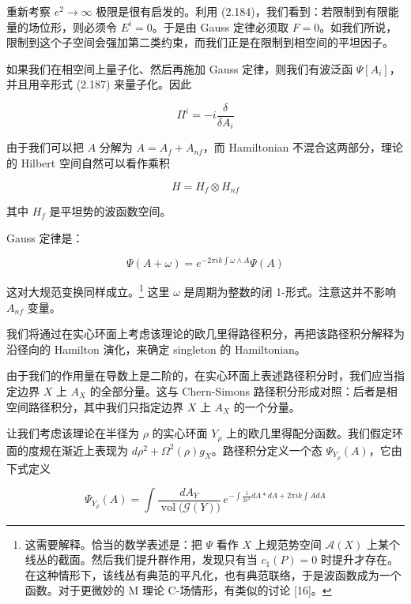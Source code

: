 重新考察 $e^2\to\infty$ 极限是很有启发的。利用 (2.184)，我们看到：若限制到有限能量的场位形，则必须令 $E^i=0$。于是由 Gauss 定律必须取 $F=0$。如我们所说，限制到这个子空间会强加第二类约束，而我们正是在限制到相空间的平坦因子。

如果我们在相空间上量子化、然后再施加 Gauss 定律，则我们有波泛函 $\Psi[A_i]$，并且用辛形式 (2.187) 来量子化。因此

\begin{equation}
  \Pi^i=-i\frac{\delta}{\delta A_i}
  \tag{2.189}
  \label{eq:2.189}
\end{equation}

由于我们可以把 $A$ 分解为 $A=A_f+A_{nf}$，而 Hamiltonian 不混合这两部分，理论的 Hilbert 空间自然可以看作乘积

\begin{equation}
  H=H_f\otimes H_{nf}
  \tag{2.190}
  \label{eq:2.190}
\end{equation}

其中 $H_f$ 是平坦势的波函数空间。

Gauss 定律是：

\begin{equation}
  \Psi(A+\omega)=e^{-2\pi ik\int\omega\wedge A}\Psi(A)
  \tag{2.191}
  \label{eq:2.191}
\end{equation}

这对大规范变换同样成立。\footnote{这需要解释。恰当的数学表述是：把 $\Psi$ 看作 $X$ 上规范势空间 $\mathcal{A}(X)$ 上某个线丛的截面。然后我们提升群作用，发现只有当 $c_1(P)=0$ 时提升才存在。在这种情形下，该线丛有典范的平凡化，也有典范联络，于是波函数成为一个函数。对于更微妙的 M 理论 C-场情形，有类似的讨论 [16]。} 这里 $\omega$ 是周期为整数的闭 1-形式。注意这并不影响 $A_{nf}$ 变量。

我们将通过在实心环面上考虑该理论的欧几里得路径积分，再把该路径积分解释为沿径向的 Hamilton 演化，来确定 singleton 的 Hamiltonian。

由于我们的作用量在导数上是二阶的，在实心环面上表述路径积分时，我们应当指定边界 $X$ 上 $A_X$ 的全部分量。这与 Chern-Simons 路径积分形成对照：后者是相空间路径积分，其中我们只指定边界 $X$ 上 $A_X$ 的一个分量。

让我们考虑该理论在半径为 $\rho$ 的实心环面 $Y_\rho$ 上的欧几里得配分函数。我们假定环面的度规在渐近上表现为 $d\rho^2+\Omega^2(\rho)g_X$。路径积分定义一个态 $\Psi_{Y_\rho}(A)$，它由下式定义

\begin{equation}
  \Psi_{Y_\rho}(A)=\int\frac{dA_Y}{\operatorname{vol}\big(\mathcal{G}(Y)\big)}\,
  e^{-\int\frac{1}{2e^2}dA*dA+2\pi ik\int AdA}
  \tag{2.192}
  \label{eq:2.192}
\end{equation}

